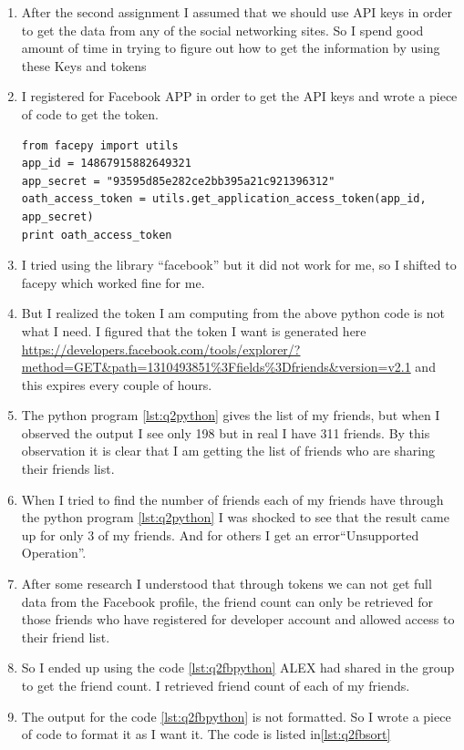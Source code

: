 \begin{enumerate}
\item After the second assignment I assumed that we should use API keys in order to get the data from any of the social networking sites. So I spend good amount of time in trying to figure out how to get the information by using these Keys and tokens
\item I registered for Facebook APP in order to get the API keys and wrote a piece of code to get the token. 
\begin{lstlisting}[frame=single]
from facepy import utils 
app_id = 14867915882649321
app_secret = "93595d85e282ce2bb395a21c921396312"
oath_access_token = utils.get_application_access_token(app_id, app_secret)
print oath_access_token
\end{lstlisting}
\item I tried using the library ``facebook'' but it did not work for me, so I shifted to facepy which worked fine for me. 
\item But I realized the token I am computing from the above python code is not what I need. I figured that the token I want is generated here \url{https://developers.facebook.com/tools/explorer/?method=GET&path=1310493851%3Ffields%3Dfriends&version=v2.1} and this expires every couple of hours. 
\item The python program \ref{lst:q2python} gives the list of my friends, but when I observed the output I see only 198 but in real I have 311 friends. By this observation it  is clear that I am getting the list of friends who are sharing their friends list.
\item When I tried to find the number of friends each of my friends have through the python program \ref{lst:q2python} I was shocked to see that the  result came up for only 3 of my friends. And for others I get an error``Unsupported Operation''.
\item After some research I understood that through tokens we can not get full data from the Facebook profile, the friend count can only be retrieved for those friends who have registered for developer account and allowed access to their friend list.
\item So I ended up using the code \ref{lst:q2fbpython} ALEX had shared in the group to get the friend count. I retrieved friend count of each of my friends. 
\item The output for the code \ref{lst:q2fbpython} is not formatted. So I wrote a piece of code to format it as I want it. The code is listed in\ref{lst:q2fbsort}

\end{enumerate}
